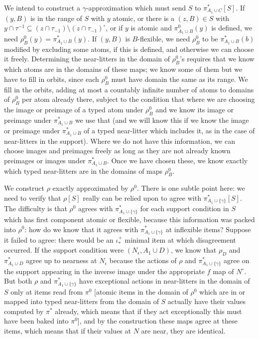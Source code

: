 \documentclass[112pt]{article}
\begin{document}
\begin{description}
We intend to construct a $\gamma$-approximation which must send $S$ to  $\pi_{A_1 \cup C}^*[S]$.  If $(y,B)$ is in the range of $S$ with $y$ atomic, 
or there is a $(z,B)\in S$ with $y \cap \tau^{-1} \subseteq (z\cap \tau_{-1}) \setminus (z\cap \tau_{-1})^\circ$, or if  $y$ is atomic and $\pi_{A_1 \cup B}^0(y)$ is defined,
we need $\rho^0_B(y) = \pi_{A_1 \cup B}^*(y)$.  If $(y,B)$ is $B$-flexible, we need $\rho^0_B$ to be $\pi_{A_1 \cup B}^*(b)$ modified by excluding some atoms, if this is defined, and otherwise we can choose it freely.  Determining the near-litters in the domain of $\rho^0_B$'s requires that we know which atoms are in the domains of these maps;  we know some of them but we have to fill in orbits, since each $\rho^0_B$ must have domain the same as its range.  We fill in the orbits, adding at most a countably infinite number of atoms to domains of $\rho^0_B$ per atom already there, subject to the condition that where we are choosing the image or preimage of a typed atom under $\rho^0_B$ and we know  its image or preimage under $\pi_{A_1 \cup B}^*$ we use that (and we will know this if
we know the image or preimage under $\pi_{A_1 \cup B}^*$ of a typed near-litter which includes it, as in the case of near-litters in the support).  Where we do not have this information, we can choose
images and preimages freely as long as they are not already known preimages or images under $\pi_{A_1 \cup B}^*$.  Once we have chosen these, we know exactly which typed near-litters are in the domains of maps $\rho^0_B$.

We construct $\rho$ exactly approximated by $\rho^0$.  There is one subtle point here:  we need to verify that $\rho[S]$ really can be relied upon to agree with $\pi^*_{A_1 \cup \{\gamma\}}[S]$.  The difficulty
is that $\rho^0$ agrees with $\pi^*_{A_1 \cup \{\gamma\}}$ for each support condition in $S$ which has first component atomic or flexible, because this information was packed into $\rho^0$:  how do we know that it agrees with $\pi^*_{A_1 \cup \{\gamma\}}$  at inflexible items?  Suppose it failed to agree:  there would be an $\iota^+_*$ minimal item at which
disagreement occurred.  If the support condition were $(N_\epsilon,A_1 \cup D)$, we know that $\rho_D$ and $\pi^*_{A_1 \cup D}$ agree up to nearness at $N_\epsilon$
because the actions of $\rho$ and  $\pi^*_{A_1 \cup \{\gamma\}}$ agree on the support appearing in the inverse image under the appropriate $f$ map
of $N^\circ$.  But both $\rho$ and  $\pi^*_{A_1 \cup \{\gamma\}}$ have exceptional actions in near-litters in the domain of $S$ only at items read from $\pi^0$ [atomic items in the domain of $\rho^0$ which are in or mapped into typed near-litters from the domain of $S$ actually have their values computed by $\pi^*$ already, which means that if they act exceptionally this must have been baked into $\pi^0$], and by the construction these maps agree at these items, which means that if their values at $N$ are near, they are identical.


\end{description}
\end{document}
